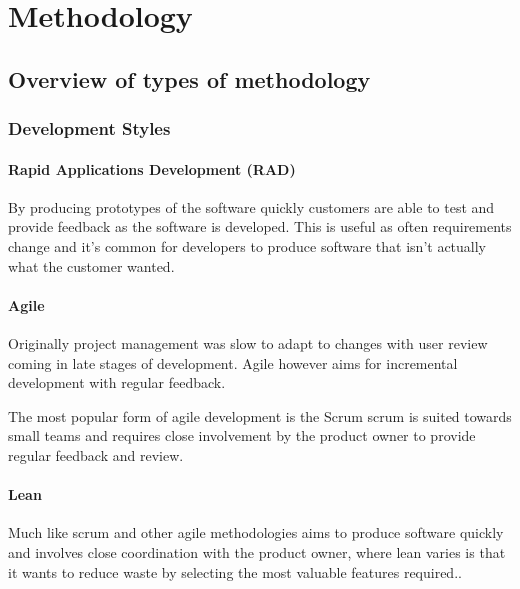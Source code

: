 \section{Methodology}\label{methodology}

\subsection{Overview of types of
methodology}\label{overview-of-types-of-methodology}

\subsubsection{Development Styles}\label{development-styles}

\paragraph{Rapid Applications Development
(RAD)}\label{rapid-applications-development-rad}

By producing prototypes of the software quickly customers are able to
test and provide feedback as the software is developed. This is useful
as often requirements change and it's common for developers to produce
software that isn't actually what the customer wanted.

\paragraph{Agile}\label{agile}

Originally project management was slow to adapt to changes with user
review coming in late stages of development. Agile however aims for
incremental development with regular feedback. \parencite{agile}

The most popular form of agile development is the Scrum
\parencite{agile} scrum is suited towards small teams and requires close
involvement by the product owner to provide regular feedback and review.

\paragraph{Lean}\label{lean}

Much like scrum and other agile methodologies aims to produce software
quickly and involves close coordination with the product owner, where
lean varies is that it wants to reduce waste by selecting the most
valuable features required.\parencite{agilemethods}.

